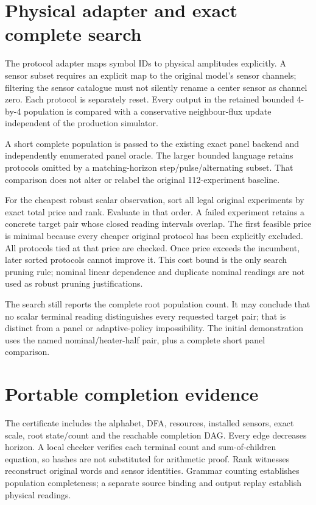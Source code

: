\documentclass[
  11pt,
  a4paper,
]{report}
\let\singularitytexttt\texttt
\renewcommand{\texttt}[1]{\singularitytexttt{\seqsplit{#1}}}
\begin{document}
\hypertarget{physical-adapter-and-exact-complete-search}{%
\section{Physical adapter and exact complete
search}\label{physical-adapter-and-exact-complete-search}}

The protocol adapter maps symbol IDs to physical amplitudes explicitly.
A sensor subset requires an explicit map to the original model's sensor
channels; filtering the sensor catalogue must not silently rename a
center sensor as channel zero. Each protocol is separately reset. Every
output in the retained bounded 4-by-4 population is compared with a
conservative neighbour-flux update independent of the production
simulator.

A short complete population is passed to the existing exact panel
backend and independently enumerated panel oracle. The larger bounded
language retains protocols omitted by a matching-horizon
step/pulse/alternating subset. That comparison does not alter or relabel
the original 112-experiment baseline.

For the cheapest robust scalar observation, sort all legal original
experiments by exact total price and rank. Evaluate in that order. A
failed experiment retains a concrete target pair whose closed reading
intervals overlap. The first feasible price is minimal because every
cheaper original protocol has been explicitly excluded. All protocols
tied at that price are checked. Once price exceeds the incumbent, later
sorted protocols cannot improve it. This cost bound is the only search
pruning rule; nominal linear dependence and duplicate nominal readings
are not used as robust pruning justifications.

The search still reports the complete root population count. It may
conclude that no scalar terminal reading distinguishes every requested
target pair; that is distinct from a panel or adaptive-policy
impossibility. The initial demonstration uses the named
nominal/heater-half pair, plus a complete short panel comparison.

\hypertarget{portable-completion-evidence}{%
\section{Portable completion
evidence}\label{portable-completion-evidence}}

The \texttt{singularity.protocol-population/1} certificate includes the
alphabet, DFA, resources, installed sensors, exact scale, root
state/count and the reachable completion DAG. Every edge decreases
horizon. A local checker verifies each terminal count and
sum-of-children equation, so hashes are not substituted for arithmetic
proof. Rank witnesses reconstruct original words and sensor identities.
Grammar counting establishes population completeness; a separate source
binding and output replay establish physical readings.
\end{document}

